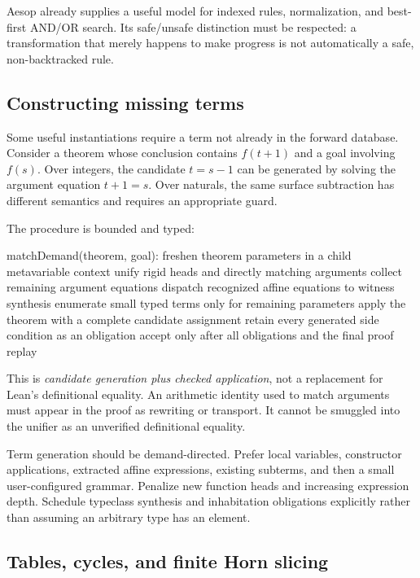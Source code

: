 \documentclass[11pt,a4paper]{article}
\begin{document}
Aesop already supplies a useful model for indexed rules, normalization, and best-first AND/OR search. Its safe/unsafe distinction must be respected: a transformation that merely happens to make progress is not automatically a safe, non-backtracked rule.\cite{aesop}

\subsection{Constructing missing terms}

Some useful instantiations require a term not already in the forward database. Consider a theorem whose conclusion contains $f(t+1)$ and a goal involving $f(s)$. Over integers, the candidate $t=s-1$ can be generated by solving the argument equation $t+1=s$. Over naturals, the same surface subtraction has different semantics and requires an appropriate guard.

The procedure is bounded and typed:
\begin{code}
matchDemand(theorem, goal):
  freshen theorem parameters in a child metavariable context
  unify rigid heads and directly matching arguments
  collect remaining argument equations
  dispatch recognized affine equations to witness synthesis
  enumerate small typed terms only for remaining parameters
  apply the theorem with a complete candidate assignment
  retain every generated side condition as an obligation
  accept only after all obligations and the final proof replay
\end{code}

This is \emph{candidate generation plus checked application}, not a replacement for Lean's definitional equality. An arithmetic identity used to match arguments must appear in the proof as rewriting or transport. It cannot be smuggled into the unifier as an unverified definitional equality.

Term generation should be demand-directed. Prefer local variables, constructor applications, extracted affine expressions, existing subterms, and then a small user-configured grammar. Penalize new function heads and increasing expression depth. Schedule typeclass synthesis and inhabitation obligations explicitly rather than assuming an arbitrary type has an element.

\subsection{Tables, cycles, and finite Horn slicing}
\end{document}
